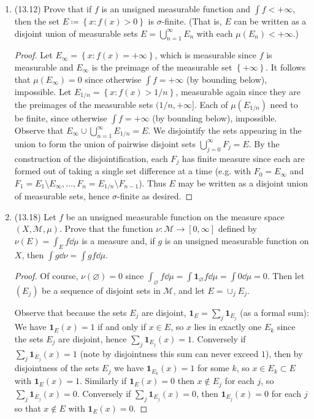 \documentclass[11pt]{article}
\newcommand{\cbr}[1]{\left\{#1\right\}}
\begin{document}
\begin{enumerate}
    \item (13.12) Prove that if $f$ is an unsigned measurable function and $\int f<+\infty$, then the set $E\coloneqq \cbr{x\colon f(x)>0}$ is $\sigma$-finite. (That is, $E$ can be written as a disjoint union of measurable sets $E = \bigcup_{n=1}^\infty E_n$ with each $\mu(E_n)<+\infty$.) \begin{proof}
        Let $E_\infty = \cbr{x\colon f(x) = +\infty}$, which is measurable since $f$ is measurable and $E_\infty$ is the preimage of the measurable set $\cbr{+\infty}$. It follows that $\mu(E_\infty) = 0$ since otherwise $\int f = +\infty$ (by bounding below), impossible. Let $E_{1/n} = \cbr{x\colon f(x)> 1/n}$, measurable again since they are the preimages of the measurable sets $(1/n,+\infty]$. Each of $\mu(E_{1/n})$ need to be finite, since otherwise $\int f = +\infty$ (by bounding below), impossible. Observe that $E_\infty \cup \bigcup_{n=1}^\infty E_{1/n} = E$. We disjointify the sets appearing in the union to form the union of pairwise disjoint sets $\bigcup_{j=0}^\infty F_j = E$. By the construction of the disjointification, each $F_j$ has finite measure since each are formed out of taking a single set difference at a time (e.g. with $F_0= E_\infty$ and $F_1 = E_1\setminus E_\infty,\dots,F_n = E_{1/n}\setminus F_{n-1}$). Thus $E$ may be written as a disjoint union of measurable sets, hence $\sigma$-finite as desired.
    \end{proof}
    \item (13.18) Let $f$ be an unsigned measurable function on the measure space $(X,\mathscr{M}, \mu)$. Prove that the function $\nu\colon \mathscr{M}\to [0,\infty]$ defined by $\nu(E) = \int_E f \dd{\mu}$ is a measure and, if $g$ is an unsigned measurable function on $X$, then $\int g \dd{\nu} = \int gf \dd{\mu}$. \begin{proof}
        Of course, $\nu(\varnothing) = 0$ since $\int_\varnothing f \dd{\mu} = \int \mathbf{1}_\varnothing f \dd{\mu} = \int 0 \dd{\mu} = 0$. Then let $(E_j)$ be a sequence of disjoint sets in $\mathscr{M}$, and let $E = \cup_j E_j$.
        
        Observe that because the sets $E_j$ are disjoint, $\mathbf{1}_E = \sum_j \mathbf{1}_{E_j}$ (as a formal sum): We have $\mathbf{1}_E(x) = 1$ if and only if $x\in E$, so $x$ lies in exactly one $E_k$ since the sets $E_j$ are disjoint, hence $\sum_j \mathbf{1}_{E_j}(x) = 1$. Conversely if $\sum_j \mathbf{1}_{E_j}(x) = 1$ (note by disjointness this sum can never exceed $1$), then by disjointness of the sets $E_j$ we have $\mathbf{1}_{E_k}(x) = 1$ for some $k$, so $x\in E_k\subset E$ with $\mathbf{1}_E(x) = 1$. Similarly if $\mathbf{1}_E(x) = 0$ then $x\not\in E_j$ for each $j$, so $\sum_j \mathbf{1}_{E_j}(x) = 0$. Conversely if $\sum_j \mathbf{1}_{E_j}(x) = 0$, then $\mathbf{1}_{E_j}(x) = 0$ for each $j$ so that $x\not\in E$ with $\mathbf{1}_E(x) = 0$.
        

\end{proof}
\end{enumerate}
\end{document}
